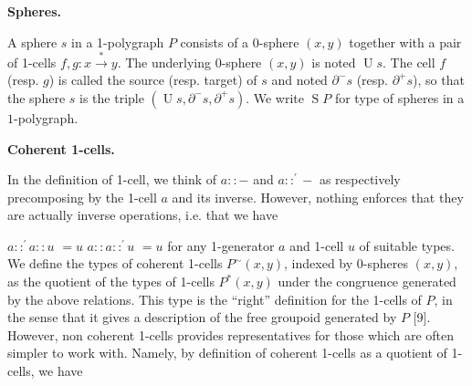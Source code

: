  
 
 
\par\medskip\noindent\textbf{Spheres.}\par
 
 
A sphere $s$ in a 1-polygraph $P$ consists of a $0$-sphere $(x,y)$ together with a pair of 1-cells $f,g:x\overset{*}{\to}y$. The underlying 0-sphere $(x,y)$ is noted $\operatorname{U}s$. The cell $f$ (resp. $g$) is called the source (resp. target) of $s$ and noted $\partial^{-}s$ (resp. $\partial^{+}s$), so that the sphere $s$ is the triple $(\operatorname{U}s,\partial^{-}s,\partial^{+}s)$. We write $\operatorname{S}P$ for type of spheres in a $1$-polygraph.\par
 
 
 
 
\par\medskip\noindent\textbf{Coherent 1-cells.}\par
 
 
In the definition of 1-cell, we think of $a::-$ and $a::^{\prime}-$ as respectively precomposing by the 1-cell $a$ and its inverse. However, nothing enforces that they are actually inverse operations, i.e. that we have\par
    $\displaystyle a::^{\prime}a::u$ $\displaystyle=u$ $\displaystyle a::a::^{\prime}u$ $\displaystyle=u$    
for any 1-generator $a$ and 1-cell $u$ of suitable types. We define the types of coherent 1-cells $P^{\sim}(x,y)$, indexed by 0-spheres $(x,y)$, as the quotient of the types of 1-cells $P^{*}(x,y)$ under the congruence generated by the above relations. This type is the “right” definition for the 1-cells of $P$, in the sense that it gives a description of the free groupoid generated by $P$ [9]. However, non coherent 1-cells provides representatives for those which are often simpler to work with. Namely, by definition of coherent 1-cells as a quotient of 1-cells, we have\par
 
 
 
